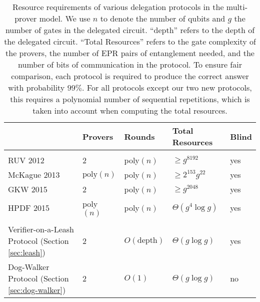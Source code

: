 \begin{table}[t]
\centering
\begin{tabular}{l|llll}
& Provers & Rounds & Total Resources & Blind\\
\hline\\[-8pt]
RUV 2012 \cite{reichardt2012classical}  &2 & poly$(n)$ & $\geq g^{8192}$ & yes\\[3pt]
McKague 2013 \cite{McKague16} &  $\mathrm{poly}(n)$ & poly$(n)$ & $\geq 2^{153}g^{22}$ & yes \\[3pt]
GKW 2015 \cite{Gheorghiu15} &  2 & poly$(n)$ & $\geq g^{2048}$ & yes \\[3pt]
HPDF 2015 \cite{hajdusek2015} &  poly$(n)$& poly$(n)$ & $\Theta(g^4\log g)$ & yes \\[3pt]
\hline\\[-8pt]
Verifier-on-a-Leash Protocol (Section \ref{sec:leash})   & 
2 & $O(\mbox{depth})$  & $\Theta(g\log g)$ & yes \\[3pt]
Dog-Walker Protocol (Section \ref{sec:dog-walker})  & 2 & $O(1)$ & $\Theta(g\log g)$ & no 
\end{tabular}
\caption{Resource requirements of various delegation protocols in the multi-prover model. 
We use $n$ to denote the number of qubits and $g$ the number of gates in the
  delegated circuit. ``depth'' refers to the depth of the delegated circuit. ``Total Resources'' refers to the gate complexity of the
  provers, the number of EPR pairs of entanglement needed, and the number of
  bits of communication in the protocol. To ensure fair comparison, 
  each protocol is required to produce the correct answer with probability $99\%$.
  For all protocols except %
our two new protocols, this requires a
  polynomial number of sequential repetitions, which is taken into account when
  computing the total resources. %
}
\label{tab:comparison}
\end{table}

